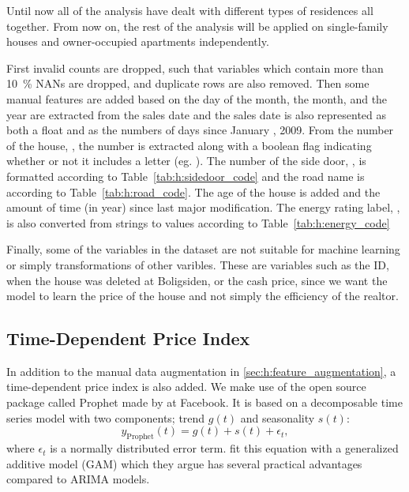 Until now all of the analysis have dealt with different types of residences all together. From now on, the rest of the analysis will be applied on single-family houses and owner-occupied apartments independently. 

First invalid counts are dropped, such that variables which contain more than \SI{10}{\percent} NANs are dropped, and duplicate rows are also removed. Then some manual features are added based on the day of the month, the month, and the year are extracted from the sales date and the sales date is also represented as both a float and as the numbers of days since January , \num{2009}. From the number of the house, , the number is extracted along with a boolean flag indicating whether or not it includes a letter (eg. ). The number of the side door, , is formatted according to Table~\ref{tab:h:sidedoor_code} and the road name is according to  Table~\ref{tab:h:road_code}. The age of the house is added and the amount of time (in year) since last major modification. The energy rating label, , is also converted from strings to values according to  Table~\ref{tab:h:energy_code} 

Finally, some of the variables in the dataset are not suitable for machine learning or simply transformations of other varibles. These are variables such as the ID, when the house was deleted at Boligsiden, or the cash price, since we want the model to learn the price of the house and not simply the efficiency of the realtor.

\subsection{Time-Dependent Price Index}

In addition to the manual data augmentation in \autoref{sec:h:feature_augmentation}, a time-dependent price index is also added. We make use of the open source package called Prophet made by \citet{taylorForecastingScale} at Facebook. It is based on a decomposable time series model \autocite{harveyEstimationProceduresStructural1990} with two components; trend $g(t)$ and seasonality $s(t)$:
\begin{equation}
  y_\mathrm{Prophet}(t) = g(t) + s(t) + \epsilon_t,
\end{equation}
where $\epsilon_t$ is a normally distributed error term. \citet{taylorForecastingScale} fit this equation with a generalized additive model (GAM) \autocite{hastieGeneralizedAdditiveModels1987} which they argue has several practical advantages compared to ARIMA models. 

